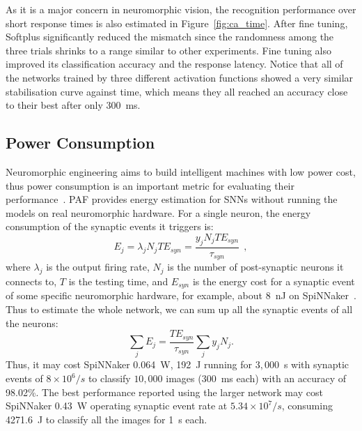 \documentclass{article}
\begin{document}
	As it is a major concern in neuromorphic vision, the recognition performance over short response times is also estimated in Figure~\ref{fig:ca_time}.
	After fine tuning, Softplus significantly reduced the mismatch since the randomness among the three trials shrinks to a range similar to other experiments.
	Fine tuning also improved its classification accuracy and the response latency.
	Notice that all of the networks trained by three different activation functions showed a very similar stabilisation curve against time, which means they all reached an accuracy close to their best after only 300~ms. 
	
	
	\subsection{Power Consumption}
	Neuromorphic engineering aims to build intelligent machines with low power cost, thus power consumption is an important metric for evaluating their performance~\cite{liu2016bench}.
	PAF provides energy estimation for SNNs without running the models on real neuromorphic hardware.
	For a single neuron, the energy consumption of the synaptic events it triggers is:
	\begin{equation}
	E_{j} = \lambda_j N_j T E_{syn} = \dfrac{y_j N_j T E_{syn}}{\tau_{syn}}~~,
	\label{equ:energy}
	\end{equation}
	where $\lambda_j$ is the output firing rate, $N_j$ is the number of post-synaptic neurons it connects to, $T$ is the testing time, and $E_{syn}$ is the energy cost for a synaptic event of some specific neuromorphic hardware, for example, about 8~nJ on SpiNNaker~\cite{stromatias2013power}.
	Thus to estimate the whole network, we can sum up all the synaptic events of all the neurons:
	\begin{equation}
	\sum_j E_{j} =  \dfrac{T E_{syn}}{\tau_{syn}} \sum_{j}y_j N_j.
	\end{equation}
	Thus, it may cost SpiNNaker 0.064~W, 192~J running for $3,000$~s with synaptic events of $8\times10^6/s$ to classify $10,000$ images (300~ms each) with an accuracy of 98.02\%.
	The best performance reported using the larger network may cost SpiNNaker 0.43~W operating synaptic event rate at $5.34\times10^7/s$, consuming 4271.6~J to classify all the images for 1~s each.
	
\end{document}
